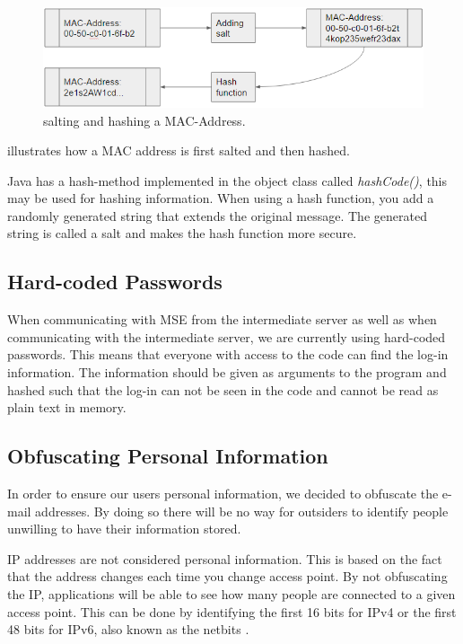 \begin{figure}[ht]
	\begin{center}
		\includegraphics[scale=0.9]{graphics/salt.png}
		\caption{salting and hashing a MAC-Address.}
		\label{fig:salt}
	\end{center} 
\end{figure}

 illustrates how a MAC address is first salted and then hashed.

Java has a hash-method implemented in the object class called \textit{hashCode()}, this may be used for hashing information. When using a hash function, you add a randomly generated string that extends the original message. The generated string is called a salt and makes the hash function more secure.

\subsection*{Hard-coded Passwords}
When communicating with MSE from the intermediate server as well as when communicating with the intermediate server, we are currently using hard-coded passwords. This means that everyone with access to the code can find the log-in information. The information should be given as arguments to the program and hashed such that the log-in can not be seen in the code and cannot be read as plain text in memory. 

 
\subsection*{Obfuscating Personal Information}
In order to ensure our users personal information, we decided to obfuscate the e-mail addresses. By doing so there will be no way for outsiders to identify people unwilling to have their information stored.

IP addresses are not considered personal information. This is based on the fact that the address changes each time you change access point. By not obfuscating the IP, applications will be able to see how many people are connected to a given access point. This can be done by identifying the first 16 bits for IPv4 or the first 48 bits for IPv6, also known as the netbits \cite{IPnetworkID}.